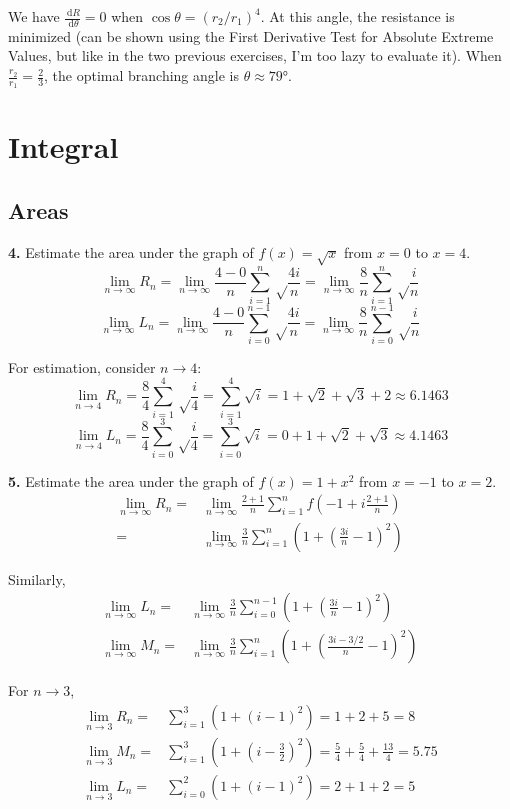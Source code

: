 \documentclass[a4paper,12pt]{article}
\newcommand{\ud}{\,\mathrm{d}}
\begin{document}
We have $\frac{\ud R}{\ud\theta} = 0$ when $\cos\theta = (r_2/r_1)^4$. At this
angle, the resistance is minimized (can be shown using the First Derivative
Test for Absolute Extreme Values, but like in the two previous exercises, I'm
too lazy to evaluate it). When $\frac{r_2}{r_1} = \frac{2}{3}$, the optimal
branching angle is $\theta \approx \ang{79}$.

\section{Integral}
\subsection{Areas}
\textbf{4. }Estimate the area under the graph of $f(x) = \sqrt{x}$ from $x = 0$
to $x = 4$.
\[\lim_{n \to \infty}R_n
= \lim_{n \to \infty}\frac{4 - 0}{n}\sum_{i = 1}^n\sqrt\frac{4i}{n}
= \lim_{n \to \infty}\frac{8}{n}\sum_{i = 1}^n\sqrt\frac{i}{n}\]
\[\lim_{n \to \infty}L_n
= \lim_{n \to \infty}\frac{4 - 0}{n}\sum_{i = 0}^{n - 1}\sqrt\frac{4i}{n}
= \lim_{n \to \infty}\frac{8}{n}\sum_{i = 0}^{n - 1}\sqrt\frac{i}{n}\]

For estimation, consider $n \to 4$:
\[\lim_{n \to 4}R_n
= \frac{8}{4}\sum_{i = 1}^4\sqrt\frac{i}{4}
= \sum_{i = 1}^4\sqrt i
= 1 + \sqrt 2 + \sqrt 3 + 2
\approx 6.1463\]
\[\lim_{n \to 4}L_n
= \frac{8}{4}\sum_{i = 0}^3\sqrt\frac{i}{4}
= \sum_{i = 0}^3\sqrt i
= 0 + 1 + \sqrt 2 + \sqrt 3
\approx 4.1463\]

\noindent\textbf{5. }Estimate the area under the graph of $f(x) = 1 + x^2$ from
$x = -1$ to $x = 2$.
\begin{align*}
  \lim_{n \to \infty}R_n
=&\lim_{n \to \infty}\frac{2 + 1}{n}\sum_{i = 1}^n
  f\left(-1 + i\frac{2 + 1}{n}\right)\\
=&\lim_{n \to \infty}\frac{3}{n}\sum_{i = 1}^n
  \left(1 + \left(\frac{3i}{n} - 1\right)^2\right)
\end{align*}

Similarly,
\begin{align*}
  \lim_{n \to \infty}L_n
=&\lim_{n \to \infty}\frac{3}{n}\sum_{i = 0}^{n - 1}
  \left(1 + \left(\frac{3i}{n} - 1\right)^2\right)\\
  \lim_{n \to \infty}M_n
=&\lim_{n \to \infty}\frac{3}{n}\sum_{i = 1}^n
  \left(1 + \left(\frac{3i - 3/2}{n} - 1\right)^2\right)
\end{align*}

For $n \to 3$,
\begin{align*}
  \lim_{n \to 3}R_n
=&\sum_{i = 1}^3\left(1 + (i - 1)^2\right)
= 1 + 2 + 5
= 8\\
  \lim_{n \to 3}M_n
=&\sum_{i = 1}^3\left(1 + \left(i - \frac{3}{2}\right)^2\right)
= \frac{5}{4} + \frac{5}{4} + \frac{13}{4}
= 5.75\\
  \lim_{n \to 3}L_n
=&\sum_{i = 0}^2\left(1 + (i - 1)^2\right)
= 2 + 1 + 2
= 5
\end{align*}
\end{document}
